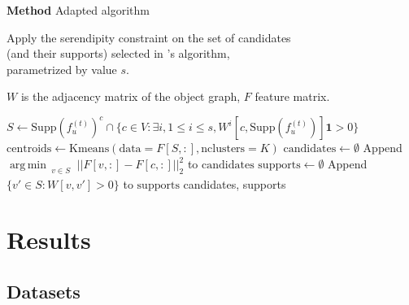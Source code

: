 \documentclass[10pt,frenchb]{beamer}
\DeclareMathOperator*{\argmin}{arg\,min\,}
\begin{document}
\begin{frame}{\textbf{Method} Adapted algorithm}

\begin{block}{}
\begin{center}
Apply the serendipity constraint on the set of candidates\\(and their supports) selected in \cite{lagree2017effective}'s algorithm,\\parametrized by value $s$.
\end{center}
\end{block}


$W$ is the adjacency matrix of the object graph, $F$ feature matrix.

\begin{algorithmic}[1]
\STATE $S \leftarrow \text{Supp}(f^{(t)}_{u})^{c} \cap \{c \in V : \exists i, 1 \leq i \leq s, W^{i}[c, \text{Supp}(f^{(t)}_{u})]\textbf{1} > 0 \}$
\STATE $\text{centroids} \leftarrow \text{Kmeans}(\text{data}=F[S,:],\text{nclusters}=K)$
\STATE $\text{candidates} \leftarrow \emptyset$
\STATE Append $\argmin_{\substack{v \in S}} ||F[v, :]-F[c, :]||^{2}_2$ to $\text{candidates}$
\ENDFOR
\STATE $\text{supports} \leftarrow \emptyset$
\STATE Append $\{v' \in S : W[v,v'] > 0\}$ to $\text{supports}$
\ENDFOR
\RETURN candidates, supports
\end{algorithmic}

\end{frame}

\section{Results}

 \begin{frame}
 \tableofcontents[currentsection]
 \end{frame}

\subsection{Datasets}
\end{document}
